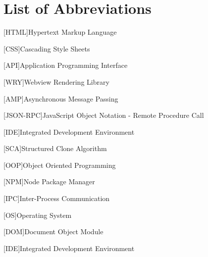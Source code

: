 \section{List of Abbreviations}
\label{sec:list-of-abbreviations}
\hfill
\begin{acronym}
    [HTML]{Hypertext Markup Language}
\end{acronym}

\begin{acronym}
    [CSS]{Cascading Style Sheets}
\end{acronym}

\begin{acronym}
    [API]{Application Programming Interface}
\end{acronym}

\begin{acronym}
    [WRY]{Webview Rendering Library}
\end{acronym}
\begin{acronym}
    [AMP]{Asynchronous Message Passing}
\end{acronym}

\begin{acronym}
    [JSON-RPC]{JavaScript Object Notation - Remote Procedure Call}
\end{acronym}

\begin{acronym}
    [IDE]{Integrated Development Environment}
\end{acronym}

\begin{acronym}
    [SCA]{Structured Clone Algorithm}
\end{acronym}

\begin{acronym}
    [OOP]{Object Oriented Programming}
\end{acronym}

\begin{acronym}
    [NPM]{Node Package Manager}
\end{acronym}

\begin{acronym}
    [IPC]{Inter-Process Communication}
\end{acronym}

\begin{acronym}
    [OS]{Operating System}
\end{acronym}


\begin{acronym}
    [DOM]{Document Object Module}
\end{acronym}

\begin{acronym}
    [IDE]{Integrated Development Environment}
\end{acronym}

